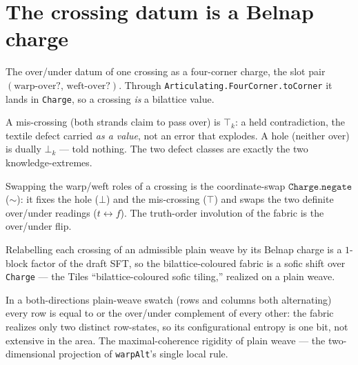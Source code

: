 \section{The crossing datum is a Belnap charge}

\begin{proposition}\label{thm:crossing-charge}\leanok{}
The over/under datum of one crossing as a four-corner charge, the slot pair
$(\text{warp-over?},\,\text{weft-over?})$. Through \texttt{Articulating.FourCorner.toCorner} it lands in
\texttt{Charge}, so a crossing \emph{is} a bilattice value.
\end{proposition}

\begin{theorem}\label{thm:miscrossing-top}\leanok{}
A mis-crossing (both strands claim to pass over) is $\top_k$: a held contradiction, the
textile defect carried \emph{as a value}, not an error that explodes. A hole (neither over)
is dually $\bot_k$ --- told nothing. The two defect classes are exactly the two
knowledge-extremes.
\end{theorem}

\begin{theorem}\label{thm:overunder-negate}\leanok{}
Swapping the warp/weft roles of a crossing is the coordinate-swap $\texttt{Charge.negate}$
($\sim$): it fixes the hole ($\bot$) and the mis-crossing ($\top$) and swaps the two
definite over/under readings ($t \leftrightarrow f$). The truth-order involution of the
fabric is the over/under flip.
\end{theorem}

\begin{theorem}\label{thm:charge-coloured-sofic}\leanok{}
Relabelling each crossing of an admissible plain weave by its Belnap charge is a $1$-block
factor of the draft SFT, so the bilattice-coloured fabric is a sofic shift over
\texttt{Charge} --- the Tiles ``bilattice-coloured sofic tiling,'' realized on a plain
weave.
\end{theorem}

\begin{theorem}\label{thm:weave-entropy-collapse}\leanok{}
In a both-directions plain-weave swatch (rows and columns both alternating) every row is
equal to or the over/under complement of every other: the fabric realizes only two distinct
row-states, so its configurational entropy is one bit, not extensive in the area. The
maximal-coherence rigidity of plain weave --- the two-dimensional projection of \texttt{warpAlt}'s
single local rule.
\end{theorem}
